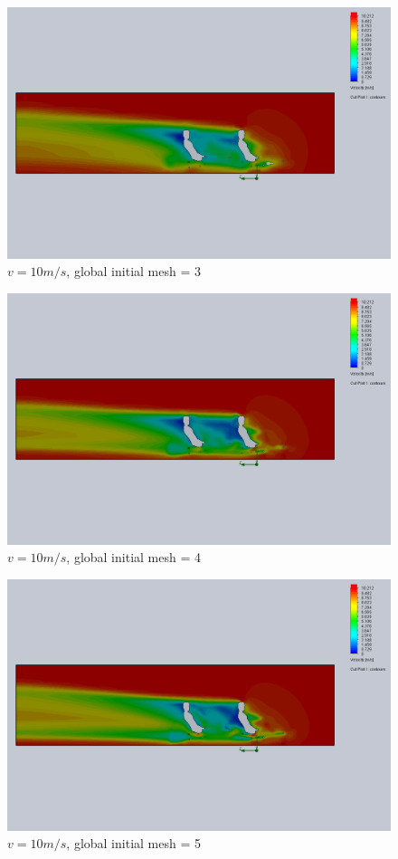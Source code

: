 \documentclass[11pt]{article}
\begin{document}
\begin{figure}
\includegraphics[width=\textwidth]{gm_3_rf_7_v10.png}
\caption{$v = 10 m/s$, global initial mesh = 3}
\end{figure}

\begin{figure}
\includegraphics[width=\textwidth]{gm_4_rf_7_v10.png}
\caption{$v = 10 m/s$, global initial mesh = 4}
\end{figure}

\begin{figure}
\includegraphics[width=\textwidth]{gm_5_rf_7_v10.png}
\caption{$v = 10 m/s$, global initial mesh = 5}
\end{figure}
\end{document}
